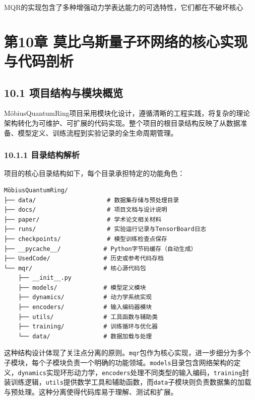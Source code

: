 \documentclass[
  12pt,
]{article}
\begin{document}
MQR的实现包含了多种增强动力学表达能力的可选特性，它们都在不破坏核心

\hypertarget{ux7b2c10ux7ae0-ux83abux6bd4ux4e4cux65afux91cfux5b50ux73afux7f51ux7edcux7684ux6838ux5fc3ux5b9eux73b0ux4e0eux4ee3ux7801ux5256ux6790}{%
\section{第10章
莫比乌斯量子环网络的核心实现与代码剖析}\label{ux7b2c10ux7ae0-ux83abux6bd4ux4e4cux65afux91cfux5b50ux73afux7f51ux7edcux7684ux6838ux5fc3ux5b9eux73b0ux4e0eux4ee3ux7801ux5256ux6790}}

\hypertarget{ux9879ux76eeux7ed3ux6784ux4e0eux6a21ux5757ux6982ux89c8}{%
\subsection{10.1
项目结构与模块概览}\label{ux9879ux76eeux7ed3ux6784ux4e0eux6a21ux5757ux6982ux89c8}}

MöbiusQuantumRing项目采用模块化设计，遵循清晰的工程实践，将复杂的理论架构转化为可维护、可扩展的代码实现。整个项目的根目录结构反映了从数据准备、模型定义、训练流程到实验记录的全生命周期管理。

\hypertarget{ux76eeux5f55ux7ed3ux6784ux89e3ux6790}{%
\subsubsection{10.1.1
目录结构解析}\label{ux76eeux5f55ux7ed3ux6784ux89e3ux6790}}

项目的核心目录结构如下，每个目录承担特定的功能角色：

\begin{verbatim}
MöbiusQuantumRing/
├── data/                    # 数据集存储与预处理目录
├── docs/                    # 项目文档与设计说明
├── paper/                   # 学术论文相关材料
├── runs/                    # 实验运行记录与TensorBoard日志
├── checkpoints/             # 模型训练检查点保存
├── __pycache__/            # Python字节码缓存（自动生成）
├── UsedCode/               # 历史或参考代码存档
└── mqr/                    # 核心源代码包
    ├── __init__.py
    ├── models/             # 模型定义模块
    ├── dynamics/           # 动力学系统实现
    ├── encoders/           # 输入编码器模块
    ├── utils/              # 工具函数与辅助类
    ├── training/           # 训练循环与优化器
    └── data/               # 数据加载与处理
\end{verbatim}

这种结构设计体现了关注点分离的原则。\texttt{mqr}包作为核心实现，进一步细分为多个子模块，每个子模块负责一个明确的功能领域。\texttt{models}目录包含网络架构的定义，\texttt{dynamics}实现环形动力学，\texttt{encoders}处理不同类型的输入编码，\texttt{training}封装训练逻辑，\texttt{utils}提供数学工具和辅助函数，而\texttt{data}子模块则负责数据集的加载与预处理。这种分离使得代码库易于理解、测试和扩展。
\end{document}
